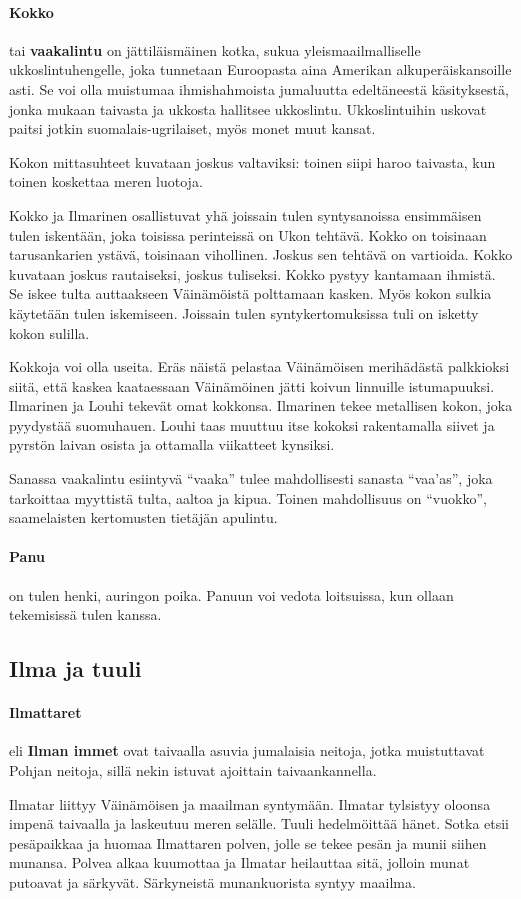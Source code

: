   \paragraph{Kokko} tai \textbf{vaakalintu} on jättiläismäinen kotka, sukua yleismaailmalliselle
    ukkos\-lintuhengelle, joka tunnetaan Euroopasta aina Amerikan alkuperäiskansoille asti. Se
    voi olla muistumaa ihmishahmoista jumaluutta edeltäneestä käsityksestä, jonka mukaan taivasta
    ja ukkosta hallitsee ukkoslintu. Ukkoslintuihin uskovat paitsi jotkin suomalais-ugrilaiset,
    myös monet muut kansat.
    \par
    Kokon mittasuhteet kuvataan joskus valtaviksi: toinen siipi haroo taivasta, kun toinen
    koskettaa meren luotoja.
    \par
    Kokko ja Ilmarinen osallistuvat yhä joissain tulen syntysanoissa ensimmäisen tulen iskentään,
    joka toisissa perinteissä on Ukon tehtävä. Kokko on toisinaan tarusankarien ystävä, toisinaan
    vihollinen. Joskus sen tehtävä on vartioida. Kokko kuvataan joskus rautaiseksi, joskus
    tuliseksi. Kokko pystyy kantamaan ihmistä. Se iskee tulta auttaakseen Väinämöistä polttamaan
    kasken. Myös kokon sulkia käytetään tulen iskemiseen. Joissain tulen syntykertomuksissa tuli
    on isketty kokon sulilla.
    \par
    Kokkoja voi olla useita. Eräs näistä pelastaa Väinämöisen merihädästä palkkioksi siitä, että
    kaskea kaataessaan Väinämöinen jätti koivun linnuille istumapuuksi. Ilmarinen ja Louhi tekevät
    omat kokkonsa. Ilmarinen tekee metallisen kokon, joka pyydystää suomuhauen. Louhi taas muuttuu
    itse kokoksi rakentamalla siivet ja pyrstön laivan osista ja ottamalla viikatteet
    kynsiksi.
    \par
    Sanassa vaakalintu esiintyvä ``vaaka'' tulee mahdollisesti sanasta ``vaa’as'', joka tarkoittaa
    myyttistä tulta, aaltoa ja kipua. Toinen mahdollisuus on ``vuokko'', saamelaisten kertomusten
    tietäjän apulintu.
  \paragraph{Panu} on tulen henki, auringon poika. Panuun voi vedota loitsuissa, kun ollaan
    tekemisissä tulen kanssa.


\subsection{Ilma ja tuuli}

  \paragraph{Ilmattaret} eli \textbf{Ilman immet} ovat taivaalla asuvia jumalaisia neitoja, jotka
    muistuttavat Pohjan neitoja, sillä nekin istuvat ajoittain taivaankannella.
    \par
    Ilmatar liittyy Väinämöisen ja maailman syntymään. Ilmatar tylsistyy oloonsa impenä taivaalla
    ja laskeutuu meren selälle. Tuuli hedelmöittää hänet. Sotka etsii pesäpaikkaa ja huomaa
    Ilmattaren polven, jolle se tekee pesän ja munii siihen munansa. Polvea alkaa kuumottaa ja
    Ilmatar heilauttaa sitä, jolloin munat putoavat ja särkyvät. Särkyneistä munankuorista syntyy
    maailma.
